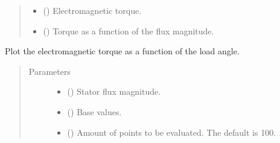 \documentclass[letterpaper,10pt,english]{sphinxmanual}
\begin{document}
\begin{fulllineitems}
\begin{fulllineitems}
\begin{quote}
\begin{description}
\begin{itemize}
\item {} 
\sphinxAtStartPar
{} () \textendash{} Electromagnetic torque.

\item {} 
\sphinxAtStartPar
{} () \textendash{} Torque as a function of the flux magnitude.

\end{itemize}


\end{description}\end{quote}

\end{fulllineitems}


\begin{fulllineitems}
\label{\detokenize{control.sm:control.sm.torque.TorqueCharacteristics.plot_angle_torque}}
\pysigstartsignatures
{}
\pysigstopsignatures
\sphinxAtStartPar
Plot the electromagnetic torque as a function of the load angle.
\begin{quote}\begin{description}
\item[{Parameters}] \leavevmode\begin{itemize}
\item {} 
\sphinxAtStartPar
{} () \textendash{} Stator flux magnitude.

\item {} 
\sphinxAtStartPar
{} () \textendash{} Base values.

\item {} 
\sphinxAtStartPar
{} (\sphinxstyleliteralemphasis{\sphinxupquote{, }}) \textendash{} Amount of points to be evaluated. The default is 100.


\end{itemize}
\end{description}
\end{quote}
\end{fulllineitems}
\end{fulllineitems}
\end{document}
